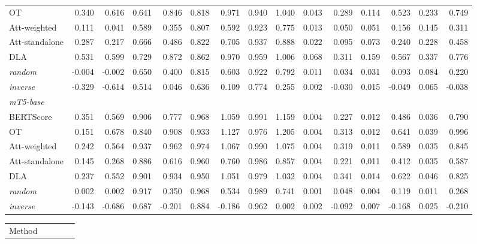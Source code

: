 \begin{table}[t]
\begin{tabular}{lrrrrrrrrrrrrrr}
OT & 0.340 & 0.616 & 0.641 & 0.846 & 0.818 & 0.971 & 0.940 & 1.040 & 0.043 & 0.289 & 0.114 & 0.523 & 0.233 & 0.749 \\
Att-weighted & 0.111 & 0.041 & 0.589 & 0.355 & 0.807 & 0.592 & 0.923 & 0.775 & 0.013 & 0.050 & 0.051 & 0.156 & 0.145 & 0.311 \\
Att-standalone & 0.287 & 0.217 & 0.666 & 0.486 & 0.822 & 0.705 & 0.937 & 0.888 & 0.022 & 0.095 & 0.073 & 0.240 & 0.228 & 0.458 \\
DLA & 0.531 & 0.599 & 0.729 & 0.872 & 0.862 & 0.970 & 0.959 & 1.006 & 0.068 & 0.311 & 0.159 & 0.567 & 0.337 & 0.776 \\
\textit{random} & -0.004 & -0.002 & 0.650 & 0.400 & 0.815 & 0.603 & 0.922 & 0.792 & 0.011 & 0.034 & 0.031 & 0.093 & 0.084 & 0.220 \\
\textit{inverse} & -0.329 & -0.614 & 0.514 & 0.046 & 0.636 & 0.109 & 0.774 & 0.255 & 0.002 & -0.030 & 0.015 & -0.049 & 0.065 & -0.038 \\
\midrule
\multicolumn{15}{l}{\emph{mT5-base}} \\
BERTScore & 0.351 & 0.569 & 0.906 & 0.777 & 0.968 & 1.059 & 0.991 & 1.159 & 0.004 & 0.227 & 0.012 & 0.486 & 0.036 & 0.790 \\
OT & 0.151 & 0.678 & 0.840 & 0.908 & 0.933 & 1.127 & 0.976 & 1.205 & 0.004 & 0.313 & 0.012 & 0.641 & 0.039 & 0.996 \\
Att-weighted & 0.242 & 0.564 & 0.937 & 0.962 & 0.974 & 1.067 & 0.990 & 1.075 & 0.004 & 0.319 & 0.011 & 0.589 & 0.035 & 0.845 \\
Att-standalone & 0.145 & 0.268 & 0.886 & 0.616 & 0.960 & 0.760 & 0.986 & 0.857 & 0.004 & 0.221 & 0.011 & 0.412 & 0.035 & 0.587 \\
DLA & 0.237 & 0.552 & 0.901 & 0.934 & 0.950 & 1.051 & 0.979 & 1.032 & 0.004 & 0.341 & 0.014 & 0.622 & 0.046 & 0.825 \\
\textit{random} & 0.002 & 0.002 & 0.917 & 0.350 & 0.968 & 0.534 & 0.989 & 0.741 & 0.001 & 0.048 & 0.004 & 0.119 & 0.011 & 0.268 \\
\textit{inverse} & -0.143 & -0.686 & 0.687 & -0.201 & 0.884 & -0.186 & 0.962 & 0.002 & 0.002 & -0.092 & 0.007 & -0.168 & 0.025 & -0.210 \\
\bottomrule
\end{tabular}
\par\medskip
\begin{tabular}{lrrrrrrrr}
\toprule
Method &  &  &  &  \\

\end{tabular}
\end{table}
